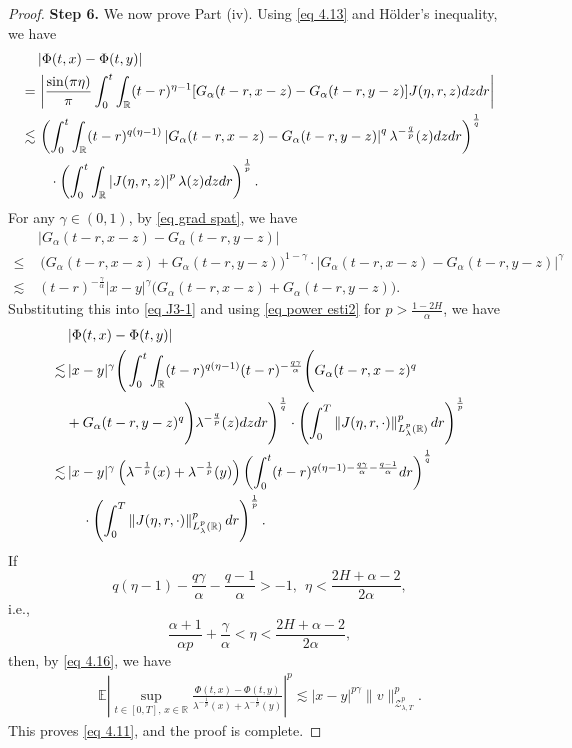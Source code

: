 \documentclass[11pt,reqno]{amsart}
\numberwithin{equation}{section}
\newcommand{\1}{{\bf 1}}
\newcommand{\2}{{\bf 2}}
\begin{document}
\begin{proof}
{\noindent \bf{Step 6.}} We now prove Part (iv). Using  \eqref{eq 4.13} and    H\"older's inequality, we have
\begin{equation}\label{eq J3-1}
\begin{split}
& \left|\Phi(t,x)-\Phi(t,y)\right|\\
 =&\, \left|\frac{\sin(\pi \eta)}{\pi}\int_0^{t}\int_{\mathbb{R}}(t-r)^{\eta-1}[G_{\alpha}(t-r,x-z)-G_{\alpha}(t-r,y-z)]J(\eta,r,z)dzdr\right| \\
 \lesssim&\, \left(\int_0^t\int_{\mathbb{R}}(t-r)^{q(\eta-1)}\left|G_{\alpha}(t-r,x-z)-G_{\alpha}(t-r,y-z)\right|^{q}\lambda^{-\frac{q}{p}}(z)dzdr\right)^{\frac1q} \\
&\hskip10pt \cdot \left( \int_0^t\int_{\mathbb{R}} \left|J(\eta,r,z)\right|^p \lambda(z)dzdr\right)^{\frac1p}.
\end{split}
\end{equation}
 For any $\gamma\in(0,1)$,  by \eqref{eq grad spat},   we have
\begin{align*}
&\big|G_{\alpha}(t-r,x-z)-G_{\alpha}(t-r,y-z)\big| \\
 \le &\, \big(G_{\alpha}(t-r,x-z)+G_{\alpha}(t-r,y-z)\big)^{1-\gamma}\cdot\big|G_{\alpha}(t-r,x-z)-G_{\alpha}(t-r,y-z)\big|^{\gamma} \\
 \lesssim \, &  (t-r)^{-\frac{\gamma}{\alpha}}|x-y|^{\gamma}\big(G_{\alpha}(t-r,x-z)+G_{\alpha}(t-r,y-z)\big).
\end{align*}
Substituting this  into \eqref{eq J3-1} and using \eqref{eq power esti2} for $p>\frac{1-2H}{\alpha}$, we have
\begin{equation*}
\begin{split}
&\left|\Phi(t,x)-\Phi(t,y)\right|\\
\lesssim&\,  |x-y|^{\gamma} \Bigg(\int_0^t\int_{\mathbb{R}}(t-r)^{q(\eta-1)}(t-r)^{-\frac{q\gamma}{\alpha}}\Bigg(G_{\alpha}(t-r,x-z)^q\\
&+G_{\alpha}(t-r,y-z)^q\Bigg)\lambda^{-\frac{q}{p}}(z)dzdr\Bigg)^{\frac1q} \cdot\left(\int_0^T\left\|J(\eta,r,\cdot)\right\|^p_{L_\lambda^p(\mathbb{R})}dr\right)^{\frac1p}\\
 \lesssim&\,  |x-y|^{\gamma}\left(\lambda^{-\frac{1}{p}}(x)+\lambda^{-\frac{1}{p}}(y)\right)\left(\int_0^t(t-r)^{q(\eta-1)-\frac{q\gamma}{\alpha}-\frac{q-1}{\alpha}}dr\right)^{\frac1q}\\
&\hskip12pt\cdot\left(\int_0^T\left\|J(\eta,r,\cdot)\right\|^p_{L_\lambda^p(\mathbb{R})}dr\right)^{\frac1p}.
\end{split}
\end{equation*}
If $$q(\eta-1)-\frac{q\gamma}{\alpha}-\frac{q-1}{\alpha}>-1, \ \  \eta<\frac{2H+\alpha-2}{2\alpha},$$ i.e.,
  $$\frac{\alpha+1}{\alpha p}+\frac{\gamma}{\alpha}<\eta<\frac{2H+\alpha-2}{2\alpha},$$ then,   by \eqref{eq 4.16}, we have 
\begin{align*}
\mathbb{E}\left|\sup_{t\in[0,T],\,x\in\mathbb{R}}\frac{\Phi(t,x)-\Phi(t,y)}{\lambda^{-\frac1p}(x)+\lambda^{-\frac1p}(y)}\right|^p\lesssim |x-y|^{p\gamma}\|v\|_{\mathcal{Z}_{\lambda,T}^p}^p.
\end{align*}
This proves \eqref{eq 4.11}, and the proof   is  complete.
\end{proof}
\end{document}
